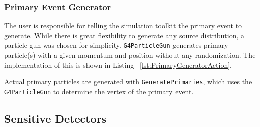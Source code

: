 \subsubsection{Primary Event Generator}

The user is responsible for telling the simulation toolkit the primary event to generate.
While there is great flexibility to generate any source distribution, a particle gun was chosen for simplicity.
\verb+G4ParticleGun+ generates primary particle(s) with a given momentum and position without any randomization.
The implementation of this is shown in Listing ~\ref{lst:PrimaryGeneratorAction}.

Actual primary particles are generated with \verb+GeneratePrimaries+, which uses the \verb+G4ParticleGun+ to determine the vertex of the primary event.


\subsection{Sensitive Detectors}

